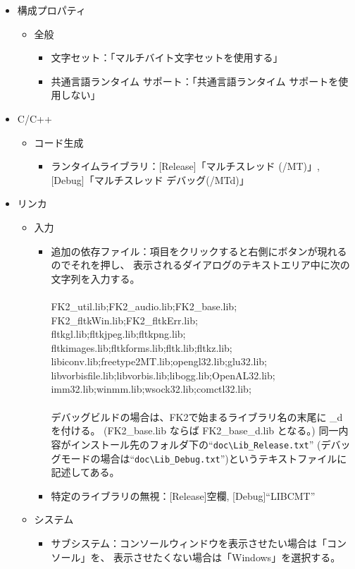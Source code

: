 \documentclass[a4j]{jarticle}
\begin{document}
\begin{itemize}
 \item 構成プロパティ
 \begin{itemize}
  \item 全般
  \begin{itemize}
   \item 文字セット：「マルチバイト文字セットを使用する」
   \item 共通言語ランタイム サポート：「共通言語ランタイム サポートを使用しない」
  \end{itemize}
 \end{itemize}
 \item C/C++
 \begin{itemize}
  \item コード生成
  \begin{itemize}
   \item ランタイムライブラリ：[Release]「マルチスレッド (/MT)」, [Debug]「マルチスレッド デバッグ(/MTd)」
  \end{itemize}
 \end{itemize}
 \item リンカ
 \begin{itemize}
  \item 入力
  \begin{itemize}
   \item 追加の依存ファイル：項目をクリックすると右側にボタンが現れるのでそれを押し、
   表示されるダイアログのテキストエリア中に次の文字列を入力する。\\ ~ \\
	FK2\_util.lib;FK2\_audio.lib;FK2\_base.lib;\\
	FK2\_fltkWin.lib;FK2\_fltkErr.lib;\\
	fltkgl.lib;fltkjpeg.lib;fltkpng.lib;\\ 
	fltkimages.lib;fltkforms.lib;fltk.lib;fltkz.lib;\\
	libiconv.lib;freetype2MT.lib;opengl32.lib;glu32.lib;\\
	libvorbisfile.lib;libvorbis.lib;libogg.lib;OpenAL32.lib;\\
	imm32.lib;winmm.lib;wsock32.lib;comctl32.lib;\\ ~ \\
   デバッグビルドの場合は、FK2で始まるライブラリ名の末尾に \_d を付ける。
   (FK2\_base.lib ならば FK2\_base\_d.lib となる。)
   同一内容がインストール先のフォルダ下の``\verb+doc\Lib_Release.txt+''
   (デバッグモードの場合は``\verb+doc\Lib_Debug.txt+'')というテキストファイルに記述してある。
   \item 特定のライブラリの無視：[Release]空欄, [Debug]``LIBCMT''
  \end{itemize}
  \item システム
  \begin{itemize}
   \item サブシステム：コンソールウィンドウを表示させたい場合は「コンソール」を、
   表示させたくない場合は「Windows」を選択する。
  \end{itemize}
 \end{itemize}
\end{itemize}
\end{document}
